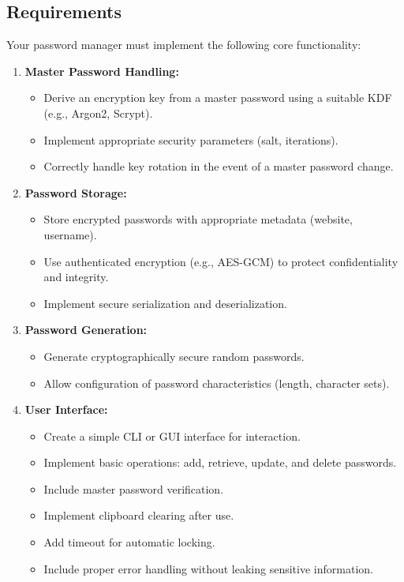 \documentclass[10pt,a4paper,american]{exam}
\begin{document}
\subsection*{Requirements}
Your password manager must implement the following core functionality:

\begin{enumerate}
	\item \textbf{Master Password Handling:}
	      \begin{itemize}
		      \item Derive an encryption key from a master password using a suitable KDF (e.g., Argon2, Scrypt).
		      \item Implement appropriate security parameters (salt, iterations).
		      \item Correctly handle key rotation in the event of a master password change.
	      \end{itemize}

	\item \textbf{Password Storage:}
	      \begin{itemize}
		      \item Store encrypted passwords with appropriate metadata (website, username).
		      \item Use authenticated encryption (e.g., AES-GCM) to protect confidentiality and integrity.
		      \item Implement secure serialization and deserialization.
	      \end{itemize}

	\item \textbf{Password Generation:}
	      \begin{itemize}
		      \item Generate cryptographically secure random passwords.
		      \item Allow configuration of password characteristics (length, character sets).
	      \end{itemize}

	\item \textbf{User Interface:}
	      \begin{itemize}
		      \item Create a simple CLI or GUI interface for interaction.
		      \item Implement basic operations: add, retrieve, update, and delete passwords.
		      \item Include master password verification.
		      \item Implement clipboard clearing after use.
		      \item Add timeout for automatic locking.
		      \item Include proper error handling without leaking sensitive information.
	      \end{itemize}
\end{enumerate}
\end{document}
